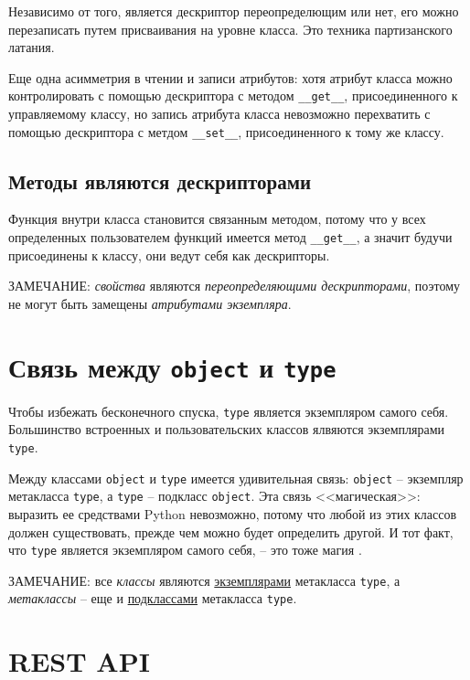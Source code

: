 \documentclass[%
	11pt,
	a4paper,
	utf8,
		]{article}
\begin{document}
Независимо от того, является дескриптор переопределющим или нет, его можно перезаписать путем присваивания на уровне класса. Это техника партизанского латания.

Еще одна асимметрия в чтении и записи атрибутов: хотя атрибут класса можно контролировать с помощью дескриптора с методом \verb|__get__|, присоединенного к управляемому классу, но запись атрибута класса невозможно перехватить с помощью дескриптора с метдом \verb|__set__|, присоединенного к тому же классу.

\subsection{Методы являются дескрипторами}

Функция внутри класса становится связанным методом, потому что у всех определенных пользователем функций имеется метод \verb|__get__|, а значит будучи присоединены к классу, они ведут себя как дескрипторы.

ЗАМЕЧАНИЕ: \emph{свойства} являются \emph{переопределяющими дескрипторами}, поэтому не могут быть замещены \emph{атрибутами экземпляра}. 

\section{Связь между \texttt{object} и \texttt{type}}

Чтобы избежать бесконечного спуска, \texttt{type} является экземпляром самого себя. Большинство встроенных и пользовательских классов ялвяются экземплярами \texttt{type}.

Между классами \texttt{object} и \texttt{type} имеется удивительная связь: \texttt{object} -- экземпляр метакласса \texttt{type}, а \texttt{type} -- подкласс \texttt{object}. Эта связь <<магическая>>: выразить ее средствами Python невозможно, потому что любой из этих классов должен существовать, прежде чем можно будет определить другой. И тот факт, что \texttt{type} является экземпляром самого себя, -- это тоже магия \cite[]{ramalho:python-2016}.

ЗАМЕЧАНИЕ: все \emph{классы} являются \underline{экземплярами} метакласса \texttt{type}, а \emph{метаклассы} -- еще и \underline{подклассами} метакласса \texttt{type}.


\section{REST API}
\end{document}
